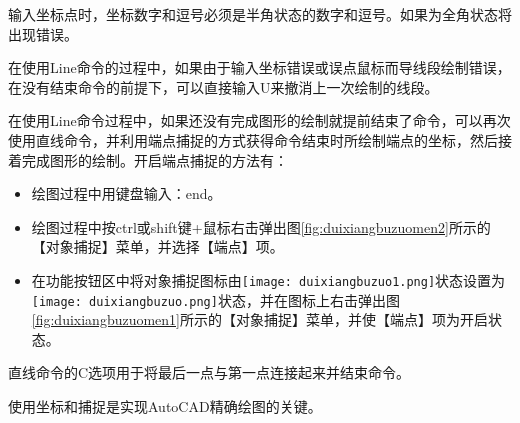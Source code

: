 \begin{tips}
\item 输入坐标点时，坐标数字和逗号必须是半角状态的数字和逗号。如果为全角状态将出现错误。
\item 在使用Line命令的过程中，如果由于输入坐标错误或误点鼠标而导线段绘制错误，在没有结束命令的前提下，可以直接输入U来撤消上一次绘制的线段。
\item 在使用Line命令过程中，如果还没有完成图形的绘制就提前结束了命令，可以再次使用直线命令，并利用端点捕捉的方式获得命令结束时所绘制端点的坐标，然后接着完成图形的绘制。开启端点捕捉的方法有：
\begin{itemize}
\item 绘图过程中用键盘输入：end。
\item 绘图过程中按ctrl或shift键+鼠标右击弹出图\ref{fig:duixiangbuzuomen2}所示的【对象捕捉】菜单，并选择【端点】项。
\begin{figure}[htbp]
\centering
\begin{floatrow}
\end{floatrow}
\end{figure}
\item 在功能按钮区中将对象捕捉图标由\texttt{[image: duixiangbuzuo1.png]}状态设置为\texttt{[image: duixiangbuzuo.png]}状态，并在图标上右击弹出图\ref{fig:duixiangbuzuomen1}所示的【对象捕捉】菜单，并使【端点】项为开启状态。
\end{itemize}
\item 直线命令的C选项用于将最后一点与第一点连接起来并结束命令。
\item 使用坐标和捕捉是实现AutoCAD精确绘图的关键。
\end{tips}



